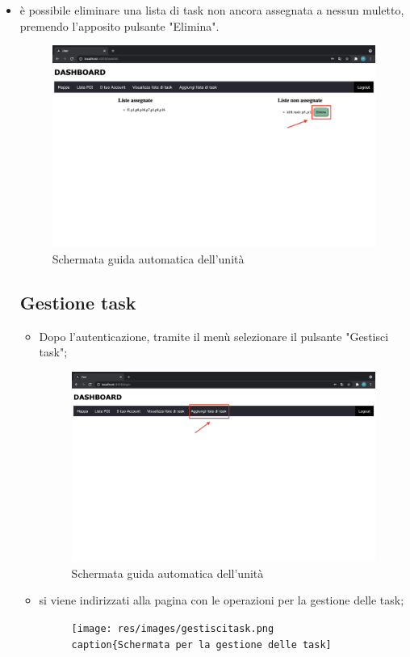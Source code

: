 \begin{itemize}
\begin{figure}[H]
    \end{figure}
    \item è possibile eliminare una lista di task non ancora assegnata a nessun muletto, premendo l'apposito pulsante "Elimina".
    \begin{figure}[H]
        \centering
        \includegraphics[scale=0.2]{res/images/deletelist.png}
        \caption{Schermata guida automatica dell'unità}
    \end{figure}
    

\subsection{Gestione task}
\begin{itemize}
    \item Dopo l'autenticazione, tramite il menù selezionare il pulsante "Gestisci task";
    \begin{figure}[H]
        \centering
        \includegraphics[scale=0.2]{res/images/dashboard9.png}
        \caption{Schermata guida automatica dell'unità}
    \end{figure}
    \item si viene indirizzati alla pagina con le operazioni per la gestione delle task;
    \begin{figure}[H]
        \centering
        \texttt{[image: res/images/gestiscitask.png
        \\caption\{Schermata per la gestione delle task]}
    \end{figure}
\end{itemize}

\end{itemize}
